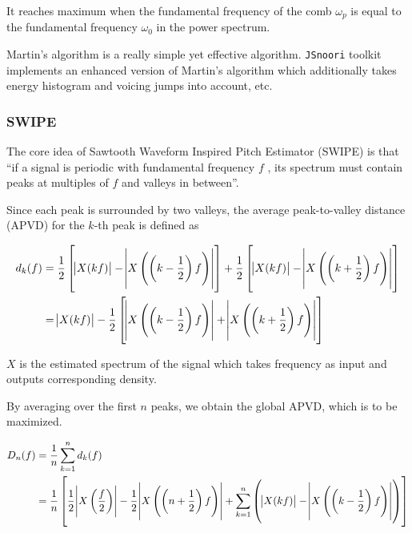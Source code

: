 \documentclass[11pt,a4paper,titlepage]{article}
\begin{document}
It reaches maximum when the fundamental frequency of the comb \(\omega_p\) is equal to the fundamental frequency \(\omega_0\) in the power spectrum.

Martin's algorithm is a really simple yet effective algorithm.
\texttt{JSnoori} toolkit implements an enhanced version of Martin's algorithm which additionally takes energy histogram and voicing jumps into account, etc.

\subsubsection{SWIPE}

The core idea of Sawtooth Waveform Inspired Pitch Estimator (SWIPE) is that \enquote{if a signal is periodic with fundamental frequency \(f\) , its spectrum must contain peaks at multiples of \(f\)  and valleys in between}.

Since each peak is surrounded by two valleys, the average peak-to-valley distance (APVD) for the \(k\)-th peak is defined as

\begin{equation}
  \begin{split}
    d_k(f) & = \frac{1}{2} \left[ \abs{X(kf)} - \abs{X \left( \left(k - \frac{1}{2}\right) f \right)} \right] + \frac{1}{2} \left[ \abs{X(kf)} - \abs{X \left( \left(k + \frac{1}{2} \right) f \right)} \right] \\
      & = \abs{X(kf)} - \frac{1}{2} \left[ \abs{X \left( \left(k - \frac{1}{2}\right) f \right)} + \abs{X \left( \left(k + \frac{1}{2}\right) f \right)} \right]
  \end{split}
\end{equation}

\(X\) is the estimated spectrum of the signal which takes frequency as input and outputs corresponding density.

By averaging over the first \(n\) peaks, we obtain the global APVD, which is to be maximized.

\begin{equation}
  \begin{split}
    D_n(f) & = \frac{1}{n} \sum_{k=1}^{n} d_k(f) \\
      & = \frac{1}{n} \left[ \frac{1}{2} \abs{X \left( \frac{f}{2} \right)} - \frac{1}{2} \abs{X \left( \left(n + \frac{1}{2}\right) f \right)} + \sum_{k=1}^{n} \left( \abs{X(kf)} - \abs{X \left( \left(k - \frac{1}{2}\right) f \right)} \right) \right]
  \end{split}
\end{equation}
\end{document}
